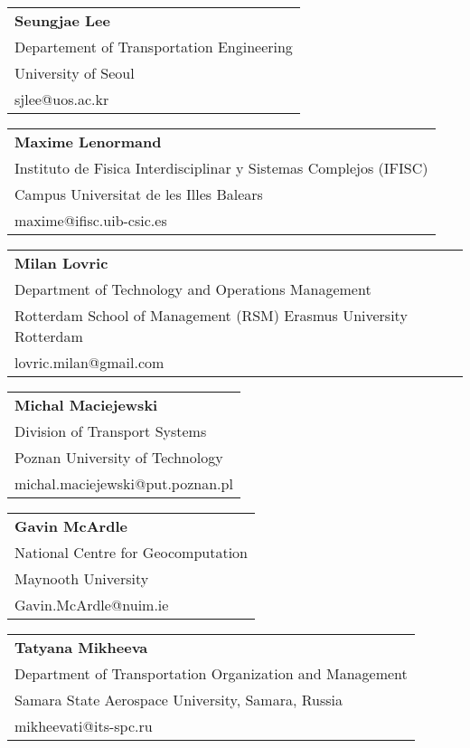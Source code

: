 \begin{tabular}[width=0.48\textwidth]{@{}l}
\textbf{Seungjae Lee} \\
Departement of Transportation Engineering \\
University of Seoul \\
sjlee@uos.ac.kr \\
\end{tabular}

\begin{tabular}[width=0.48\textwidth]{@{}l}
\textbf{Maxime Lenormand} \\
Instituto de Fisica Interdisciplinar y Sistemas Complejos (IFISC) \\
Campus Universitat de les Illes Balears \\
maxime@ifisc.uib-csic.es   \\
\end{tabular}

\begin{tabular}[width=0.48\textwidth]{@{}l}
\textbf{Milan Lovric} \\
Department of Technology and Operations Management \\
Rotterdam School of Management (RSM) Erasmus University Rotterdam \\
lovric.milan@gmail.com  \\
\end{tabular}

\begin{tabular}[width=0.48\textwidth]{@{}l}
\textbf{Michal Maciejewski} \\
Division of Transport Systems \\
Poznan University of Technology \\
michal.maciejewski@put.poznan.pl \\
\end{tabular}

\begin{tabular}[width=0.48\textwidth]{@{}l}
\textbf{Gavin McArdle} \\
National Centre for Geocomputation \\
Maynooth University \\
Gavin.McArdle@nuim.ie \\
\end{tabular}

\begin{tabular}[width=0.48\textwidth]{@{}l}
\textbf{Tatyana Mikheeva} \\
Department of Transportation Organization and Management \\
Samara State Aerospace University, Samara, Russia \\
mikheevati@its-spc.ru \\
\end{tabular}

